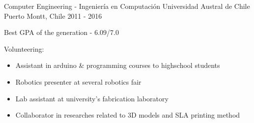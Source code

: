 

\begin{cventries}

\cventry
	{Computer Engineering - Ingeniería en Computación} %
	{Universidad Austral de Chile} %
	{Puerto Montt, Chile} %
	{2011 - 2016} %
	{
	\begin{cvitems} %
		\item {Best GPA of the generation - 6.09/7.0}
		\item {Volunteering:}
		\begin{itemize}
			\item {Assistant in arduino \& programming courses to highschool students}
			\item {Robotics presenter at several robotics fair}
			\item {Lab assistant at university's fabrication laboratory}
			\item {Collaborator in researches related to 3D models and SLA printing method}
		\end{itemize}
	\end{cvitems}
	}
\end{cventries}